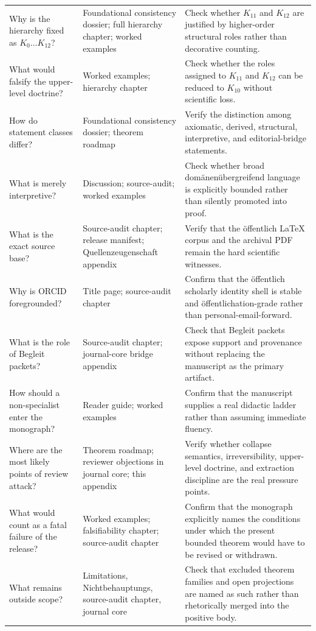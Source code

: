 \begin{longtable}{p{3.4cm} p{4.4cm} p{5.7cm}}
Why is the hierarchy fixed as \(K_0\dots K_{12}\)? & Foundational consistency dossier; full hierarchy chapter; worked examples & Check whether \(K_{11}\) and \(K_{12}\) are justified by higher-order structural roles rather than decorative counting. \\
What would falsify the upper-level doctrine? & Worked examples; hierarchy chapter & Check whether the roles assigned to \(K_{11}\) and \(K_{12}\) can be reduced to \(K_{10}\) without scientific loss. \\
How do statement classes differ? & Foundational consistency dossier; theorem roadmap & Verify the distinction among axiomatic, derived, structural, interpretive, and editorial-bridge statements. \\
What is merely interpretive? & Discussion; source-audit; worked examples & Check whether broad domänenübergreifend language is explicitly bounded rather than silently promoted into proof. \\
What is the exact source base? & Source-audit chapter; release manifest; Quellenzeugenschaft appendix & Verify that the öffentlich LaTeX corpus and the archival PDF remain the hard scientific witnesses. \\
Why is ORCID foregrounded? & Title page; source-audit chapter & Confirm that the öffentlich scholarly identity shell is stable and öffentlichation-grade rather than personal-email-forward. \\
What is the role of Begleit packets? & Source-audit chapter; journal-core bridge appendix & Check that Begleit packets expose support and provenance without replacing the manuscript as the primary artifact. \\
How should a non-specialist enter the monograph? & Reader guide; worked examples & Confirm that the manuscript supplies a real didactic ladder rather than assuming immediate fluency. \\
Where are the most likely points of review attack? & Theorem roadmap; reviewer objections in journal core; this appendix & Verify whether collapse semantics, irreversibility, upper-level doctrine, and extraction discipline are the real pressure points. \\
What would count as a fatal failure of the release? & Worked examples; falsifiability chapter; source-audit chapter & Confirm that the monograph explicitly names the conditions under which the present bounded theorem would have to be revised or withdrawn. \\
What remains outside scope? & Limitations, Nichtbehauptungs, source-audit chapter, journal core & Check that excluded theorem families and open projections are named as such rather than rhetorically merged into the positive body. \\
\end{longtable}

